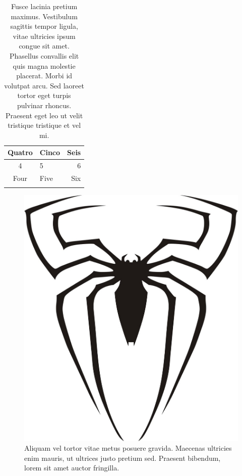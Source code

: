 \documentclass[book,A4paper,10pt,twoside,oldfontcommands]{memoir}\usepackage[]{graphicx}\usepackage[usenames,dvipsnames]{color}
\begin{document}
\begin{table}[h]
\centering
\caption{Fusce lacinia pretium maximus. Vestibulum sagittis tempor
  ligula, vitae ultricies ipsum congue sit amet. Phasellus convallis
  elit quis magna molestie placerat. Morbi id volutpat arcu. Sed
  laoreet tortor eget turpis pulvinar rhoncus. Praesent eget leo ut
  velit tristique tristique et vel mi.}
\begin{tabular}{clr} 
\hline
Quatro & Cinco & Seis\\
\hline
4 & 5 & 6 \\
Four & Five & Six\\
\hline
\label{Tab:A1}
\end{tabular}
\end{table}


\begin{figure}[htb]
  \centering
  \includegraphics[scale=0.10]{figuras/spiderman.jpg}
  \caption{Aliquam vel tortor vitae metus posuere gravida. Maecenas
    ultricies enim mauris, ut ultrices justo pretium sed. Praesent
    bibendum, lorem sit amet auctor fringilla.}
  \label{fig:A1}
\end{figure}
\end{document}
